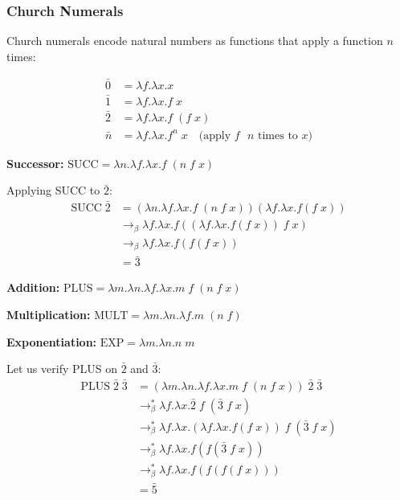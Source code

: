 \subsubsection*{Church Numerals}

Church numerals encode natural numbers as functions that apply a function $n$ times:

\begin{definition}
\begin{align*}
\bar{0} &= \lambda f.\lambda x. x \\
\bar{1} &= \lambda f.\lambda x. f\; x \\
\bar{2} &= \lambda f.\lambda x. f\; (f\; x) \\
\bar{n} &= \lambda f.\lambda x. f^n\; x \quad \text{(apply $f$ $n$ times to $x$)}
\end{align*}
\end{definition}

\begin{example}
\textbf{Successor:} $\text{SUCC} = \lambda n.\lambda f.\lambda x. f\;(n\; f\; x)$

Applying SUCC to $\bar{2}$:
\begin{align*}
\text{SUCC}\; \bar{2}
&= (\lambda n.\lambda f.\lambda x. f\;(n\; f\; x))(\lambda f.\lambda x. f(f\; x)) \\
&\to_\beta \lambda f.\lambda x. f((\lambda f.\lambda x. f(f\; x))\; f\; x) \\
&\to_\beta \lambda f.\lambda x. f(f(f\; x)) \\
&= \bar{3}
\end{align*}

\textbf{Addition:} $\text{PLUS} = \lambda m.\lambda n.\lambda f.\lambda x. m\; f\;(n\; f\; x)$

\textbf{Multiplication:} $\text{MULT} = \lambda m.\lambda n.\lambda f. m\;(n\; f)$

\textbf{Exponentiation:} $\text{EXP} = \lambda m.\lambda n. n\; m$

Let us verify PLUS on $\bar{2}$ and $\bar{3}$:
\begin{align*}
\text{PLUS}\; \bar{2}\; \bar{3}
&= (\lambda m.\lambda n.\lambda f.\lambda x. m\; f\;(n\; f\; x))\; \bar{2}\; \bar{3} \\
&\to_\beta^* \lambda f.\lambda x. \bar{2}\; f\;(\bar{3}\; f\; x) \\
&\to_\beta^* \lambda f.\lambda x. (\lambda f.\lambda x. f(f\; x))\; f\;(\bar{3}\; f\; x) \\
&\to_\beta^* \lambda f.\lambda x. f(f(\bar{3}\; f\; x)) \\
&\to_\beta^* \lambda f.\lambda x. f(f(f(f\; x))) \\
&= \bar{5}
\end{align*}
\end{example}

